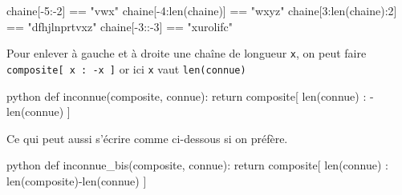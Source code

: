 

\begin{solution}
\begin{idleconsole}
\begin{pyconsole}
chaine[-5:-2] == "vwx"
chaine[-4:len(chaine)] == "wxyz"
chaine[3:len(chaine):2] == "dfhjlnprtvxz"
chaine[-3::-3] == "xurolifc"
\end{pyconsole}
\end{idleconsole}
\end{solution}

\begin{solution}
Pour enlever à gauche et à droite une chaîne de longueur \texttt{x}, on peut faire \texttt{composite[ x : -x ]}
or ici \texttt{x} vaut \texttt{len(connue)}

\begin{listingbox}{python}
def inconnue(composite, connue):
    return composite[ len(connue) : -len(connue) ]
\end{listingbox}

Ce qui peut aussi s'écrire comme ci-dessous si on préfère.
\begin{listingbox}{python}
def inconnue_bis(composite, connue):
    return composite[ len(connue) : len(composite)-len(connue) ]
\end{listingbox}
\end{solution}

